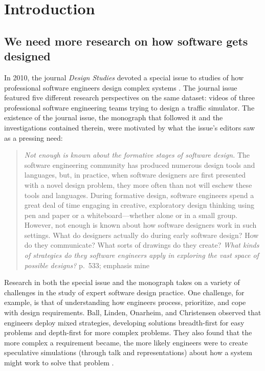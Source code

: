 \section{Introduction}\label{introduction}

\subsection{We need more research on how software gets designed}\label{we-need-more-research-on-how-software-gets-designed}

In 2010, the journal \emph{Design Studies} devoted a special issue to studies of how professional software engineers design complex systems \cite{petre_editorial_2010}. The journal issue featured five different research perspectives on the same dataset: videos of three professional software engineering teams trying to design a traffic simulator. The existence of the journal issue, the monograph that followed it \cite{petre_software_2014} and the investigations contained therein, were motivated by what the issue's editors saw as a pressing need:

\begin{quote}
\emph{Not enough is known about the formative stages of software design.} The software engineering community has produced numerous design tools and languages, but, in practice, when software designers are first presented with a novel design problem, they more often than not will eschew these tools and languages. During formative design, software engineers spend a great deal of time engaging in creative, exploratory design thinking using pen and paper or a whiteboard---whether alone or in a small group. However, not enough is known about how software designers work in such settings. What do designers actually do during early software design? How do they communicate? What sorts of drawings do they create? \emph{What kinds of strategies do they software engineers apply in exploring the vast space of possible designs?} \cite{petre_editorial_2010} p.~533; emphasis mine
\end{quote}

Research in both the special issue \cite{petre_editorial_2010} and the monograph \cite{petre_software_2014} takes on a variety of challenges in the study of expert software design practice. One challenge, for example, is that of understanding how engineers process, prioritize, and cope with design requirements. Ball, Linden, Onarheim, and Christensen \cite{ball_design_2010} observed that engineers deploy mixed strategies, developing solutions breadth-first for easy problems and depth-first for more complex problems. They also found that the more complex a requirement became, the more likely engineers were to create speculative simulations (through talk and representations) about how a system might work to solve that problem \cite{ball_design_2010}.

